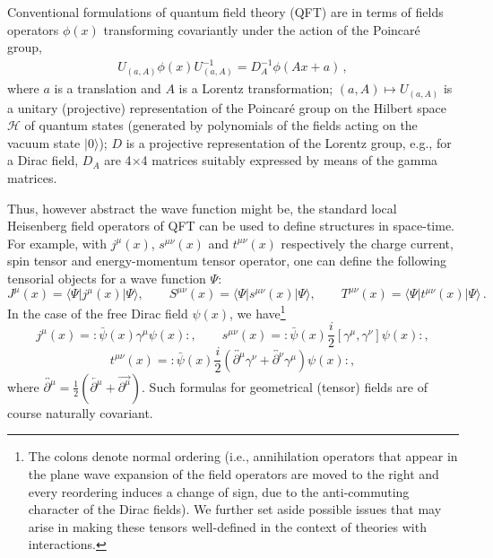 \documentclass[12pt]{article}
\begin{document}
Conventional formulations of quantum field theory (QFT) are in terms of fields operators $\phi(x)$ transforming covariantly under the action of the Poincar\'e group,
\begin{align}
U_{(a,A)} \phi(x) U_{(a,A)}^{-1} = D_A^{-1} \phi (Ax+a)\,,
\label{eq:qfinvariance}\end{align}
where $a$ is a translation and $A$ is a Lorentz transformation; $(a, A) \mapsto U_{(a,A)}$ is a unitary (projective) representation of the Poincar\'e group  on the Hilbert space $\mathscr{H}$ of quantum states (generated by polynomials of the fields acting on the vacuum state $|0\rangle$);   $D$ is a projective representation of the Lorentz group, e.g., for a Dirac field, $D_A$ are 4$\times$4 matrices suitably expressed by means of the gamma matrices. 

Thus, however abstract the wave function might be, the
standard local Heisenberg field operators of QFT can be used to define structures in
space-time. For example, with $j^\mu(x)$, $s^{\mu\nu}(x)$ and $t^{\mu\nu}(x)$ respectively the charge current, spin tensor and energy-momentum tensor operator, one can define the following tensorial objects for a wave function $\Psi$:
\begin{equation} 
J^{\mu}(x)= \langle \Psi{} | j^\mu(x) | \Psi{} \rangle, \qquad S^{\mu \nu}(x)  = \langle \Psi | s^{\mu\nu}(x) | \Psi{} \rangle  , \qquad T^{\mu \nu}(x) = \langle \Psi | t^{\mu\nu}(x) | \Psi{} \rangle \,.
\label{tensors}
\end{equation}
In the case of the free Dirac field $\psi(x)$, we have{\footnote{The colons denote normal ordering (i.e., annihilation operators that appear in the plane wave expansion of the field operators are moved to the right and every reordering induces a change of sign, due to the anti-commuting character of the Dirac fields). We further set aside possible issues that may arise in making these tensors  well-defined in the context of theories with interactions.}}
\begin{equation} 
j^{\mu}(x)=  : \bar{\psi} (x)\gamma^\mu \psi (x):  ,\qquad s^{\mu\nu}(x) = :\bar{\psi} (x)  \frac{i}{2} \left[
  \gamma^\mu, \gamma^\nu \right]   \psi(x):  ,
\nonumber
\end{equation}
\begin{equation} 
t^{\mu\nu}(x) = : 
\bar{\psi}(x) \frac{i}{2} \left(
  {\overleftrightarrow{\partial^\mu}}\gamma^\nu +
  {\overleftrightarrow{\partial^\nu}}\gamma^\mu \right) \psi(x):,
\end{equation} 
where
${\overleftrightarrow{\partial^\mu}} = \frac{1}{2} \left( 
{\overleftarrow{\partial^\mu}} + {\overrightarrow{\partial^\mu}} \right)$.
Such formulas for geometrical (tensor) fields are of course 
naturally covariant.
\end{document}
